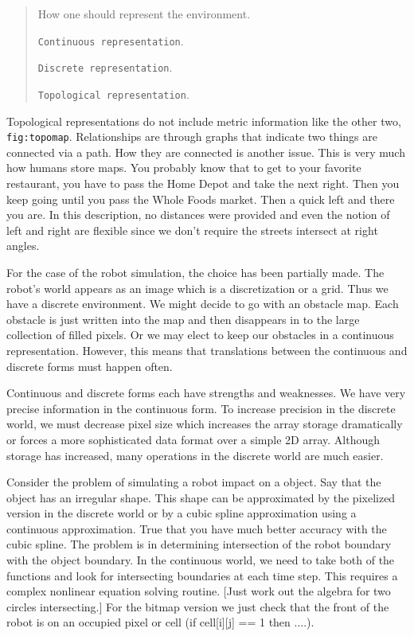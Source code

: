\begin{quote}
How one should represent the environment.

\texttt{Continuous\ representation}.

\texttt{Discrete\ representation}.

\texttt{Topological\ representation}.
\end{quote}

Topological representations do not include metric information like the
other two, \texttt{fig:topomap}. Relationships are through graphs that
indicate two things are connected via a path. How they are connected is
another issue. This is very much how humans store maps. You probably
know that to get to your favorite restaurant, you have to pass the Home
Depot and take the next right. Then you keep going until you pass the
Whole Foods market. Then a quick left and there you are. In this
description, no distances were provided and even the notion of left and
right are flexible since we don't require the streets intersect at right
angles.

For the case of the robot simulation, the choice has been partially
made. The robot's world appears as an image which is a discretization or
a grid. Thus we have a discrete environment. We might decide to go with
an obstacle map. Each obstacle is just written into the map and then
disappears in to the large collection of filled pixels. Or we may elect
to keep our obstacles in a continuous representation. However, this
means that translations between the continuous and discrete forms must
happen often.

Continuous and discrete forms each have strengths and weaknesses. We
have very precise information in the continuous form. To increase
precision in the discrete world, we must decrease pixel size which
increases the array storage dramatically or forces a more sophisticated
data format over a simple 2D array. Although storage has increased, many
operations in the discrete world are much easier.

Consider the problem of simulating a robot impact on a object. Say that
the object has an irregular shape. This shape can be approximated by the
pixelized version in the discrete world or by a cubic spline
approximation using a continuous approximation. True that you have much
better accuracy with the cubic spline. The problem is in determining
intersection of the robot boundary with the object boundary. In the
continuous world, we need to take both of the functions and look for
intersecting boundaries at each time step. This requires a complex
nonlinear equation solving routine. {[}Just work out the algebra for two
circles intersecting.{]} For the bitmap version we just check that the
front of the robot is on an occupied pixel or cell (if
cell{[}i{]}{[}j{]} == 1 then ....).

